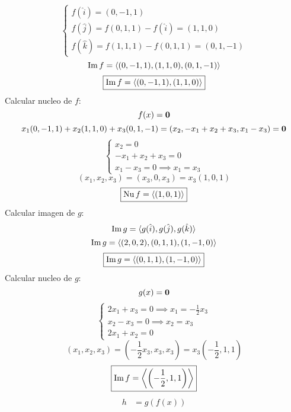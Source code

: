 \documentclass[../practica.root.tex]{subfiles}
\begin{document}
\begin{enumerate}
\begin{enumerate}
\[\begin{cases}
                            f(\hat{i}) = (0, -1, 1)                      \\
                            f(\hat{j}) = f(0,1,1)-f(\hat{i}) = (1, 1, 0) \\
                            f(\hat{k}) = f(1,1,1)-f(0,1,1) = (0,1,-1)
                        \end{cases}
                    \] \[
                        \operatorname{Im} f = \langle (0,-1,1),(1,1,0),(0,1,-1) \rangle
                    \] \[
                        \boxed{\operatorname{Im} f = \langle (0,-1,1),(1,1,0) \rangle}
                    \]
                    Calcular nucleo de \(f\):
                    \[ f(x) = \mathbf{0} \]
                    \[ x_1(0,-1,1) + x_2(1,1,0) + x_3(0,1,-1) = (x_2,-x_1+x_2+x_3,x_1-x_3) = \mathbf{0} \]
                    \[
                        \begin{cases}
                            x_2 = 0              \\
                            -x_1 + x_2 + x_3 = 0 \\
                            x_1 - x_3 = 0 \implies x_1 = x_3
                        \end{cases}
                    \]
                    \[ (x_1,x_2,x_3) = (x_3,0,x_3) = x_3(1,0,1) \]
                    \[ \boxed{\operatorname{Nu} f = \langle (1,0,1) \rangle} \]
                    Calcular imagen de \(g\):
                    \[ \operatorname{Im} g = \langle g(\hat{i}),g(\hat{j}),g(\hat{k}) \rangle \]
                    \[ \operatorname{Im} g = \langle (2,0,2),(0,1,1),(1,-1,0) \rangle \]
                    \[ \boxed{\operatorname{Im} g = \langle (0,1,1),(1,-1,0) \rangle} \]
                    Calcular nucleo de \(g\):
                    \[
                        g(x) = \mathbf{0}
                    \] \[
                        \begin{cases}
                            2x_1 + x_3 = 0 \implies x_1 = -\frac{1}{2}x_3 \\
                            x_2 - x_3 = 0 \implies x_2 = x_3              \\
                            2x_1 + x_2 = 0
                        \end{cases}
                    \] \[
                        (x_1, x_2, x_3) = \left(-\frac{1}{2}x_3, x_3, x_3\right) = x_3\left(-\frac{1}{2},1,1\right)
                    \] \[
                        \boxed{\operatorname{Im} f = \left\langle \left(-\frac{1}{2},1,1\right) \right\rangle }
                    \]
                    \begin{align*}
                        h & = g(f(x))                                                        \\

\end{align*}
\end{enumerate}
\end{enumerate}
\end{document}
